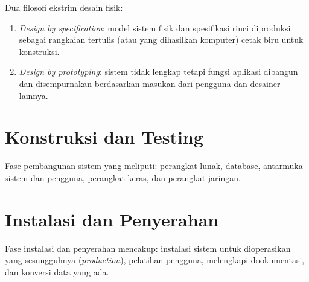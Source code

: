 \noindent
Dua filosofi ekstrim desain fisik:
\begin{enumerate}[itemsep=-1ex]
\item \textit{Design by specification}: model sistem fisik dan spesifikasi rinci diproduksi sebagai rangkaian tertulis (atau yang dihasilkan komputer) cetak biru untuk konstruksi. 
\item \textit{Design by prototyping}: sistem tidak lengkap tetapi fungsi aplikasi dibangun dan disempurnakan berdasarkan masukan dari pengguna dan desainer lainnya.
\end{enumerate}

\section{Konstruksi dan Testing}
Fase pembangunan sistem yang meliputi: perangkat lunak, database, antarmuka sistem dan pengguna, perangkat keras, dan perangkat jaringan.

\section{Instalasi dan Penyerahan}
Fase instalasi dan penyerahan mencakup: instalasi sistem untuk dioperasikan yang sesungguhnya (\textit{production}), pelatihan pengguna, melengkapi dookumentasi, dan konversi data yang ada.